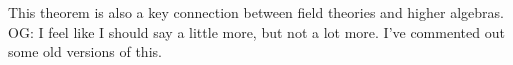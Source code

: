 \documentclass[11pt]{amsart}
\def\owen#1{{\textcolor{violet!50!black}{OG: {#1}}}}
\begin{document}
This theorem is also a key connection between field theories and higher algebras.
\owen{I feel like I should say a little more, but not a lot more. I've commented out some old versions of this.}

%
\end{document}
